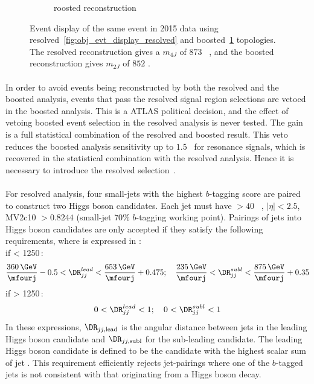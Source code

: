 \begin{figure}[htbp!]
\begin{subfigure}[b]{0.45\textwidth}
        \caption{roosted reconstruction}
        \label{fig:obj_evt_display_boosted}
    \end{subfigure}
\caption{Event display of the same event in 2015 data using resolved~\ref{fig:obj_evt_display_resolved} and  boosted~\ref{fig:obj_evt_display_boosted} topologies. The resolved reconstruction gives a $m_{4J}$ of $873$ \GeV~, and the boosted reconstruction gives $m_{2J}$ of $852$ \GeV. }
\label{fig:obj_evt_display}
\end{figure}

\paragraph{}
In order to avoid events being reconstructed by both the resolved and the boosted analysis, events that pass the resolved signal region selections are vetoed in the boosted analysis.
This is a ATLAS political decision, and the effect of vetoing boosted event selection in the resolved analysis is never tested.
The gain is a full statistical combination of the resolved and boosted result.
This veto reduces the boosted analysis sensitivity up to $1.5$\TeV~ for resonance signals, which is recovered in the statistical combination with the resolved analysis.
Hence it is necessary to introduce the resolved selection~\cite{Aaboud:2018knk}.

\paragraph{}
For resolved analysis, four small-\R jets with the highest $b$-tagging score are paired to construct two Higgs boson candidates.  
Each jet must have \pt $> 40$ \GeV~, $|\eta| < 2.5$, MV2c10 $> 0.8244$ (small-\R jet $70\%$ $b$-tagging working point). 
Pairings of jets into Higgs boson candidates are only accepted if they satisfy the following requirements, where \mfourj is expressed in \GeV:\\
if \mfourj  < 1250\,\GeV:
\begin{equation}
\frac{360\,\GeV}{\mfourj} - 0.5 < \DR_{jj}^{lead} < \frac{653\,\GeV}{\mfourj} + 0.475;\quad
\frac{235\,\GeV}{\mfourj} < \DR_{jj}^{subl}  < \frac{875\,\GeV}{\mfourj} + 0.35
\end{equation}
\quad if \mfourj  > 1250\,\GeV:
\begin{equation}
0< \DR_{jj}^{lead} < 1;\quad 0 < \DR_{jj}^{subl} < 1
\end{equation}
In these expressions, $\DR_{jj, \mathrm{lead}}$ is the angular distance between jets in the leading Higgs boson candidate and $\DR_{jj, \mathrm{subl}}$ for the sub-leading candidate. 
The leading Higgs boson candidate is defined to be the candidate with the highest scalar sum of jet \pt. 
This requirement efficiently rejects jet-pairings where one of the $b$-tagged jets is not consistent with that originating from a Higgs boson decay.


